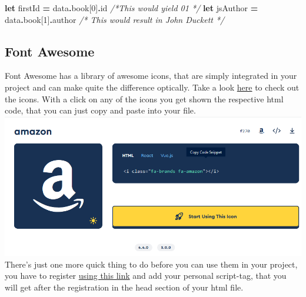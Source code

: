 \documentclass[
]{article}
\newenvironment{Shaded}{\begin{snugshade}}{\end{snugshade}}
\newcommand{\AttributeTok}[1]{\textcolor[rgb]{0.77,0.63,0.00}{#1}}
\newcommand{\CommentTok}[1]{\textcolor[rgb]{0.56,0.35,0.01}{\textit{#1}}}
\newcommand{\DecValTok}[1]{\textcolor[rgb]{0.00,0.00,0.81}{#1}}
\newcommand{\KeywordTok}[1]{\textcolor[rgb]{0.13,0.29,0.53}{\textbf{#1}}}
\newcommand{\NormalTok}[1]{#1}
\newcommand{\OperatorTok}[1]{\textcolor[rgb]{0.81,0.36,0.00}{\textbf{#1}}}
\begin{document}
\begin{Shaded}
\begin{Highlighting}[]
\KeywordTok{let}\NormalTok{ firstId }\OperatorTok{=}\NormalTok{ data}\OperatorTok{.}\AttributeTok{book}\NormalTok{[}\DecValTok{0}\NormalTok{]}\OperatorTok{.}\AttributeTok{id} \CommentTok{/*This would yield 01 */}
\KeywordTok{let}\NormalTok{ jsAuthor }\OperatorTok{=}\NormalTok{ data}\OperatorTok{.}\AttributeTok{book}\NormalTok{[}\DecValTok{1}\NormalTok{]}\OperatorTok{.}\AttributeTok{author} \CommentTok{/* This would result in John Duckett */}  
\end{Highlighting}
\end{Shaded}

\hypertarget{font-awesome}{%
\subsection{Font Awesome}\label{font-awesome}}

Font Awesome has a library of awesome icons, that are simply integrated in your project and can make quite the difference optically.
Take a look \href{https://fontawesome.com/search?m=free}{here} to check out the icons. With a click on any of the icons you get shown the respective html code, that you can just copy and paste into your file.
\includegraphics{docs/assets/font-awesome.png}
There's just one more quick thing to do before you can use them in your project, you have to register \href{https://fontawesome.com/v6/docs/web/setup/get-started}{using this link} and add your personal script-tag, that you will get after the registration in the head section of your html file.
\end{document}
